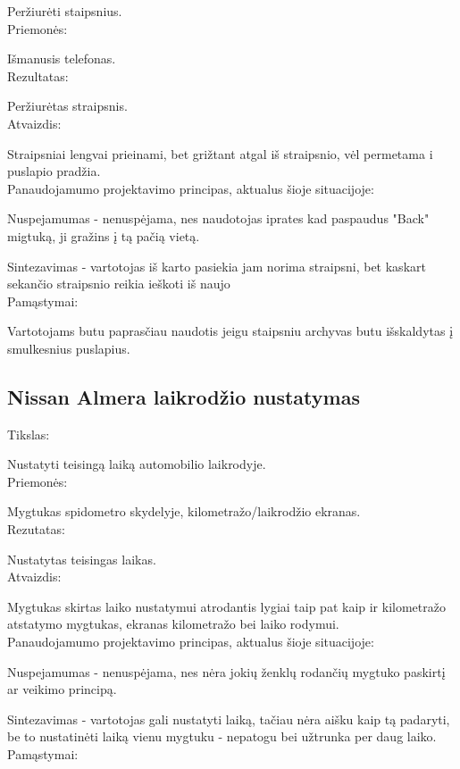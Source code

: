 ﻿\documentclass[a4paper, 12pt]{article}
\newcommand{\placeholder}{\textbf{\textsf{\textcolor{red}{\fbox{PLACEHOLDER}}}}}
\begin{document}
		Peržiurėti staipsnius.\\
		Priemonės:
		
		Išmanusis telefonas.\\
		Rezultatas:
		
		Peržiurėtas straipsnis.\\
		Atvaizdis:
		
		Straipsniai lengvai prieinami, bet grižtant atgal iš straipsnio, vėl permetama i puslapio pradžia.\\
		
		Panaudojamumo projektavimo principas, aktualus šioje situacijoje:
		
		Nuspejamumas - nenuspėjama, nes naudotojas iprates kad paspaudus "Back" migtuką, ji gražins į tą pačią vietą.
		
		Sintezavimas - vartotojas iš karto pasiekia jam norima straipsni, bet kaskart sekančio straipsnio reikia ieškoti iš naujo\\		
		Pamąstymai:
		
		Vartotojams butu paprasčiau naudotis jeigu staipsniu archyvas butu išskaldytas į smulkesnius puslapius.
		\placeholder

	\subsection{Nissan Almera laikrodžio nustatymas}
		Tikslas:
		
		Nustatyti teisingą laiką automobilio laikrodyje.\\
		Priemonės:
		
		Mygtukas spidometro skydelyje, kilometražo/laikrodžio ekranas.\\
		Rezutatas:
		
		Nustatytas teisingas laikas.\\
		Atvaizdis:
		
		Mygtukas skirtas laiko nustatymui atrodantis lygiai taip pat kaip ir kilometražo atstatymo mygtukas,
		ekranas kilometražo bei laiko rodymui.\\
		
		Panaudojamumo projektavimo principas, aktualus šioje situacijoje:
		
		Nuspejamumas - nenuspėjama, nes nėra jokių ženklų rodančių mygtuko paskirtį ar veikimo principą.
		
		Sintezavimas - vartotojas gali nustatyti laiką, tačiau nėra aišku kaip tą padaryti, be
		to nustatinėti laiką vienu mygtuku - nepatogu bei užtrunka per daug laiko.\\		
		Pamąstymai:
		
\end{document}
